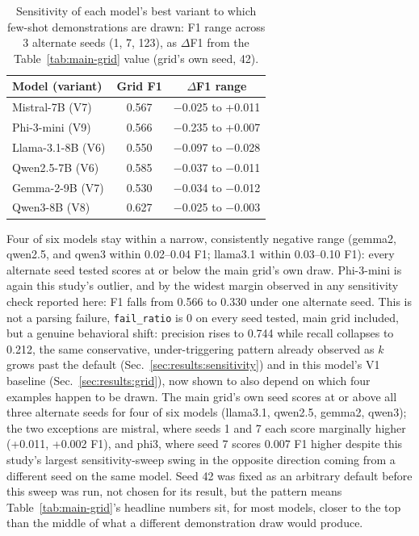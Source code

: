 \begin{table}[t]
\centering
\footnotesize
\caption{Sensitivity of each model's best variant to which few-shot
demonstrations are drawn: F1 range across 3 alternate seeds (1, 7, 123),
as $\Delta$F1 from the Table~\ref{tab:main-grid} value (grid's own seed,
42).}
\label{tab:seed-sensitivity}
\begin{tabular}{lcc}
\toprule
Model (variant) & Grid F1 & $\Delta$F1 range \\
\midrule
Mistral-7B (V7) & 0.567 & $-$0.025 to +0.011 \\
Phi-3-mini (V9) & 0.566 & $-$0.235 to +0.007 \\
Llama-3.1-8B (V6) & 0.550 & $-$0.097 to $-$0.028 \\
Qwen2.5-7B (V6) & 0.585 & $-$0.037 to $-$0.011 \\
Gemma-2-9B (V7) & 0.530 & $-$0.034 to $-$0.012 \\
Qwen3-8B (V8) & 0.627 & $-$0.025 to $-$0.003 \\
\bottomrule
\end{tabular}
\end{table}

Four of six models stay within a narrow, consistently negative range
(gemma2, qwen2.5, and qwen3 within 0.02--0.04 F1; llama3.1 within
0.03--0.10 F1): every alternate seed tested scores at or below the main
grid's own draw. Phi-3-mini is again this study's outlier, and by the
widest margin observed in any sensitivity check reported here: F1 falls
from 0.566 to 0.330 under one alternate seed. This is not a parsing
failure, \texttt{fail\_ratio} is 0 on every seed tested, main grid
included, but a genuine behavioral shift: precision rises to 0.744 while
recall collapses to 0.212, the same conservative, under-triggering
pattern already observed as $k$ grows past the default
(Sec.~\ref{sec:results:sensitivity}) and in this model's V1 baseline
(Sec.~\ref{sec:results:grid}), now shown to also depend on which four
examples happen to be drawn. The main grid's own seed scores at or above
all three alternate seeds for four of six models (llama3.1, qwen2.5,
gemma2, qwen3); the two exceptions are mistral, where seeds 1 and 7 each
score marginally higher (+0.011, +0.002 F1), and phi3, where seed 7
scores 0.007 F1 higher despite this study's largest sensitivity-sweep
swing in the opposite direction coming from a different seed on the same
model. Seed 42 was fixed as an arbitrary default before this sweep was
run, not chosen for its result, but the pattern means
Table~\ref{tab:main-grid}'s headline numbers sit, for most models, closer
to the top than the middle of what a different demonstration draw would
produce.

